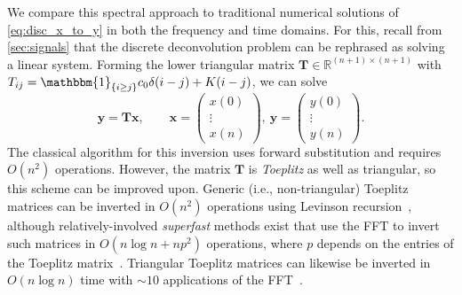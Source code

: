 \documentclass{cams-l} %
\newcommand{\dave}[1]{#1}\newcommand{\davebegin}{}\newcommand{\daveend}{}\newcommand{\george}[1]{#1}
\newcommand{\RR}{\mathbb R}
\theoremstyle{definition}
\theoremstyle{remark}
\numberwithin{equation}{section}
\begin{document}
We compare this spectral approach to \dave{traditional} numerical solutions of \cref{eq:disc_x_to_y} in both the frequency and time domains. For this, recall from \cref{sec:signals} that the discrete deconvolution problem can be rephrased as solving a linear system. Forming the lower triangular matrix $\mathbf{T} \in \RR^{(n+1) \times (n+1)}$ with $T_{ij} = \mathbbm{1}_{\{i \geq j\}} c_0\delta(i-j) + K(i-j)$, we can solve
\begin{equation}
    \mathbf{y} = \mathbf{T}\mathbf{x}, \qquad \mathbf{x} = \begin{pmatrix}x(0)\\ \vdots\\ x(n)\end{pmatrix}, \ \mathbf{y} = \begin{pmatrix}y(0)\\ \vdots\\ y(n)\end{pmatrix}.
\end{equation}
The classical algorithm for this inversion uses forward substitution and requires $O(n^2)$ operations. However, the matrix $\mathbf{T}$ is \textit{Toeplitz} as well as triangular, so this scheme can be improved upon. Generic (i.e., non-triangular) Toeplitz matrices can be inverted in $O(n^2)$ operations using Levinson recursion~\cite{wiener1964wiener}, although relatively-involved \textit{superfast} methods exist that use the FFT to invert such matrices in $O(n\log n + np^2)$ operations, where $p$ depends on the entries of the Toeplitz matrix~\cite{chandrasekaran2008superfast}. Triangular Toeplitz matrices can likewise be inverted in $O(n \log n)$ time with $\sim 10$ applications of the FFT~\cite{commenges1984fast}. 
\end{document}
